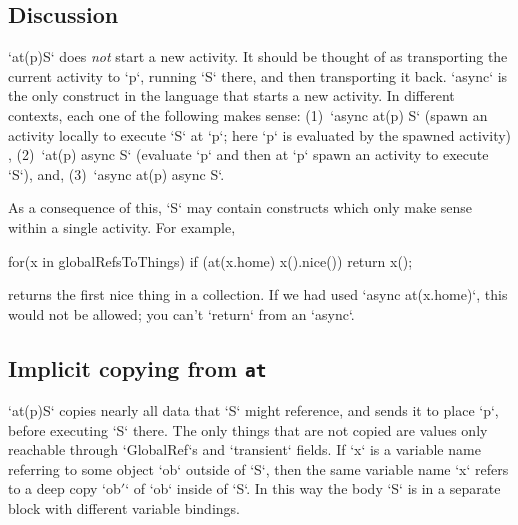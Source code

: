 




\subsection{Discussion}
\xcd`at(p)S` does {\em not} start a new activity.  It should be thought of as
transporting the current activity to \xcd`p`, running \xcd`S` there, and then
transporting it back.  \xcd`async` is the only construct in the
language that starts a new activity. In different contexts, each one
of the following makes sense:
(1)~\xcd`async at(p) S` (spawn an activity locally to execute \xcd`S` at
\xcd`p`; here \xcd`p` is evaluated by the spawned activity) , 
(2)~\xcd`at(p) async S` (evaluate \xcd`p` and then at \xcd`p` spawn an
activity to execute \xcsd`S`), and,
(3)~\xcd`async at(p) async S`. 

As a consequence of this, \xcd`S` may contain constructs which only make sense
within a single activity.  
For example, 
\begin{xten}
    for(x in globalRefsToThings) 
      if (at(x.home) x().nice()) 
        return x();
\end{xten}
returns the first nice thing in a collection.   If we had used 
\xcd`async at(x.home)`, this would not be allowed; 
you can't \xcd`return` from an
\xcd`async`. 

\subsection{Implicit copying from {\tt at} }

\xcd`at(p)S` copies nearly all data that \xcd`S` might reference, and sends it
to place \xcd`p`, before executing \xcd`S` there. The only things that are not
copied are values only reachable through \xcd`GlobalRef`s and \xcd`transient`
fields.    If \xcd`x` is a
variable name referring to some object \xcd`ob` outside of \xcd`S`, then the
same variable name \xcd`x` refers to a deep copy \xcd`ob{$'$}` of \xcd`ob`
inside of \xcd`S`.  In this way the body \xcd`S` is in a separate block with
different variable bindings.

